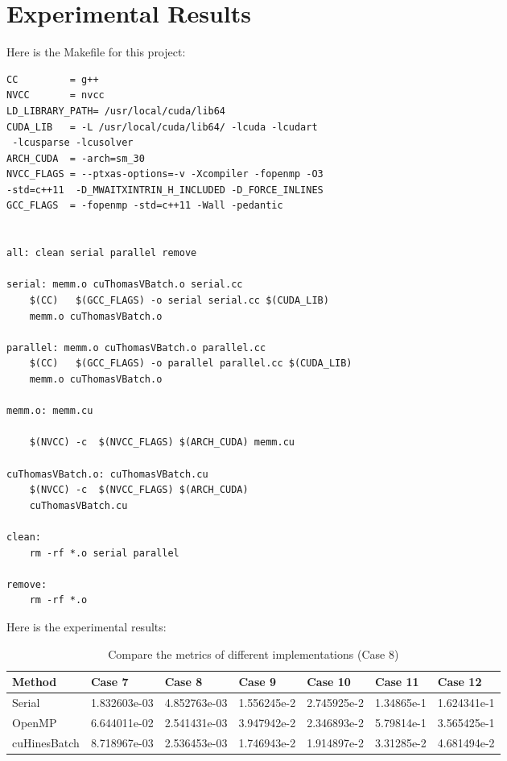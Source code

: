 
\chapter{Experimental Results}

Here is the Makefile for this project:

\begin{lstlisting}[title = {Makefile}]
    CC		   = g++
NVCC       = nvcc
LD_LIBRARY_PATH= /usr/local/cuda/lib64
CUDA_LIB   = -L /usr/local/cuda/lib64/ -lcuda -lcudart
 -lcusparse -lcusolver 
ARCH_CUDA  = -arch=sm_30
NVCC_FLAGS = --ptxas-options=-v -Xcompiler -fopenmp -O3 
-std=c++11  -D_MWAITXINTRIN_H_INCLUDED -D_FORCE_INLINES  
GCC_FLAGS  = -fopenmp -std=c++11 -Wall -pedantic  


all: clean serial parallel remove

serial: memm.o cuThomasVBatch.o serial.cc
    $(CC)   $(GCC_FLAGS) -o serial serial.cc $(CUDA_LIB) 
    memm.o cuThomasVBatch.o	

parallel: memm.o cuThomasVBatch.o parallel.cc
    $(CC)   $(GCC_FLAGS) -o parallel parallel.cc $(CUDA_LIB) 
    memm.o cuThomasVBatch.o	

memm.o: memm.cu

	$(NVCC) -c  $(NVCC_FLAGS) $(ARCH_CUDA) memm.cu

cuThomasVBatch.o: cuThomasVBatch.cu 
    $(NVCC) -c  $(NVCC_FLAGS) $(ARCH_CUDA) 
    cuThomasVBatch.cu	 

clean:
	rm -rf *.o serial parallel

remove:
	rm -rf *.o
\end{lstlisting}

\vspace{5ex}
Here is the experimental results:

\begin{table}[htbp]
	\caption{Compare the metrics of different implementations (Case 8)}
	\centering
	\begin{tabular}[width=1.0\linewidth]{lllllll}
		\toprule
		\quad Method & Case 7 & Case 8 & Case 9 & Case 10 & Case 11 & Case 12\\
    \midrule
    Serial            & 1.832603e-03 & 4.852763e-03 & 1.556245e-2  & 2.745925e-2  & 1.34865e-1   & 1.624341e-1   \\
    OpenMP            & 6.644011e-02 & 2.541431e-03 & 3.947942e-2  & 2.346893e-2  & 5.79814e-1   & 3.565425e-1   \\
    cuHinesBatch      & 8.718967e-03 & 2.536453e-03 & 1.746943e-2  & 1.914897e-2  & 3.31285e-2   & 4.681494e-2   \\
    \bottomrule
	\end{tabular}
	\label{tab:table1}
\end{table}

